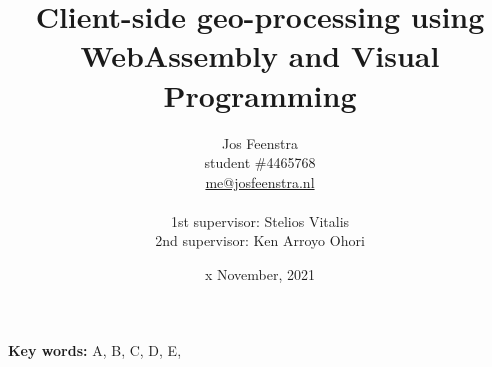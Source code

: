 \titlehead{\centering\texttt{[image: images/thumbnail.png]}}
\title{Client-side geo-processing using WebAssembly and Visual Programming}

\author{
  Jos Feenstra\\
  student \#4465768 \\
  \url{me@josfeenstra.nl}\\
  \\
  1st supervisor: Stelios Vitalis \\
  2nd supervisor: Ken Arroyo Ohori \\
}

\date{x November, 2021}


\clearpage\maketitle
\thispagestyle{empty}

\begin{flushleft}
  \textbf{Key words:} A, B, C, D, E, 
\end{flushleft}
\newpage